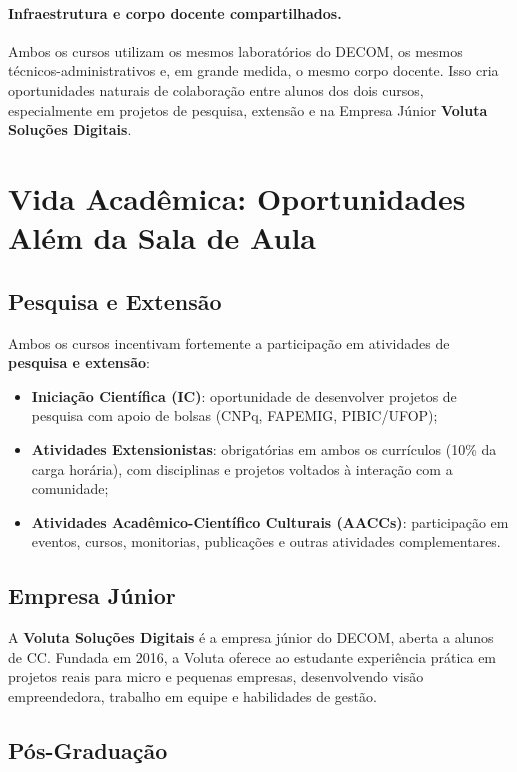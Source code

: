 \documentclass[9pt,a4paper]{extarticle}
\begin{document}
\paragraph{Infraestrutura e corpo docente compartilhados.}
Ambos os cursos utilizam os mesmos laboratórios do DECOM, os mesmos técnicos-administrativos e, em grande medida, o mesmo corpo docente. Isso cria oportunidades naturais de colaboração entre alunos dos dois cursos, especialmente em projetos de pesquisa, extensão e na Empresa Júnior \textbf{Voluta Soluções Digitais}.

\section{Vida Acadêmica: Oportunidades Além da Sala de Aula}

\subsection{Pesquisa e Extensão}

Ambos os cursos incentivam fortemente a participação em atividades de \textbf{pesquisa e extensão}:
\begin{itemize}
  \item \textbf{Iniciação Científica (IC)}: oportunidade de desenvolver projetos de pesquisa com apoio de bolsas (CNPq, FAPEMIG, PIBIC/UFOP);
  \item \textbf{Atividades Extensionistas}: obrigatórias em ambos os currículos (10\% da carga horária), com disciplinas e projetos voltados à interação com a comunidade;
  \item \textbf{Atividades Acadêmico-Científico Culturais (AACCs)}: participação em eventos, cursos, monitorias, publicações e outras atividades complementares.
\end{itemize}

\subsection{Empresa Júnior}

A \textbf{Voluta Soluções Digitais} é a empresa júnior do DECOM, aberta a alunos de CC. Fundada em 2016, a Voluta oferece ao estudante experiência prática em projetos reais para micro e pequenas empresas, desenvolvendo visão empreendedora, trabalho em equipe e habilidades de gestão.

\subsection{Pós-Graduação}
\end{document}

